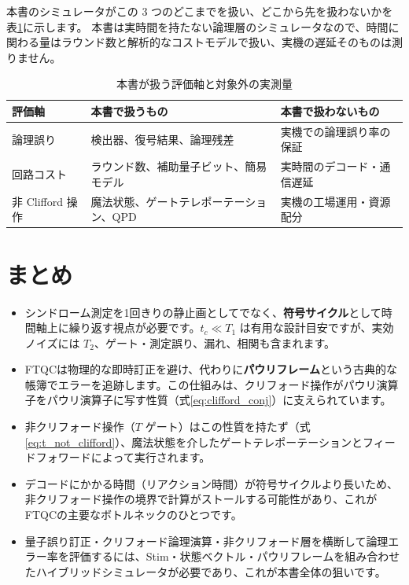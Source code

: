本書のシミュレータがこの 3 つのどこまでを扱い、どこから先を扱わないかを表\ref{tab:ch5_integrated_goals}に示します。
本書は実時間を持たない論理層のシミュレータなので、時間に関わる量はラウンド数と解析的なコストモデルで扱い、実機の遅延そのものは測りません。

\begin{table}[htbp]
  \centering
  \caption{本書が扱う評価軸と対象外の実測量}
  \label{tab:ch5_integrated_goals}
  \begin{tabularx}{\textwidth}{>{\raggedright\arraybackslash}p{}X X}
    \hline
    \textbf{評価軸} & \textbf{本書で扱うもの} & \textbf{本書で扱わないもの} \\
    \hline
    論理誤り & 検出器、復号結果、論理残差 & 実機での論理誤り率の保証 \\
    回路コスト & ラウンド数、補助量子ビット、簡易モデル & 実時間のデコード・通信遅延 \\
    非 Clifford 操作 & 魔法状態、ゲートテレポーテーション、QPD & 実機の工場運用・資源配分 \\
    \hline
  \end{tabularx}
\end{table}

\section{まとめ}\label{ch5:summary}

\begin{itemize}
  \item シンドローム測定を1回きりの静止画としてでなく、\textbf{符号サイクル}として時間軸上に繰り返す視点が必要です。$t_c\ll T_1$ は有用な設計目安ですが、実効ノイズには $T_2$、ゲート・測定誤り、漏れ、相関も含まれます。
  \item FTQCは物理的な即時訂正を避け、代わりに\textbf{パウリフレーム}という古典的な帳簿でエラーを追跡します。この仕組みは、クリフォード操作がパウリ演算子をパウリ演算子に写す性質（式\eqref{eq:clifford_conj}）に支えられています。
  \item 非クリフォード操作（$T$ ゲート）はこの性質を持たず（式\eqref{eq:t_not_clifford}）、魔法状態を介したゲートテレポーテーションとフィードフォワードによって実行されます。
  \item デコードにかかる時間（リアクション時間）が符号サイクルより長いため、非クリフォード操作の境界で計算がストールする可能性があり、これがFTQCの主要なボトルネックのひとつです。
  \item 量子誤り訂正・クリフォード論理演算・非クリフォード層を横断して論理エラー率を評価するには、Stim・状態ベクトル・パウリフレームを組み合わせたハイブリッドシミュレータが必要であり、これが本書全体の狙いです。
\end{itemize}

